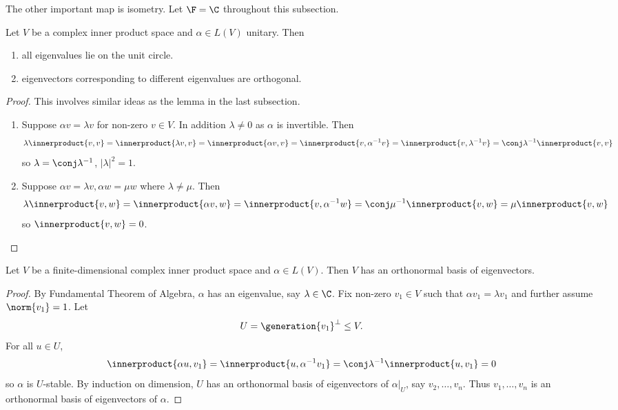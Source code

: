 \documentclass[a4paper]{article}
\newcommand*{\spans}{\generation}
\newcommand*{\ip}{\innerproduct}
\theoremstyle{definition}
\begin{document}
The other important map is isometry. Let \(\F = \C\) throughout this subsection.

\begin{lemma}
  Let \(V\) be a complex inner product space and \(\alpha \in L(V)\) unitary. Then
  \begin{enumerate}
  \item all eigenvalues lie on the unit circle.
  \item eigenvectors corresponding to different eigenvalues are orthogonal.
  \end{enumerate}
\end{lemma}

\begin{proof}
  This involves similar ideas as the lemma in the last subsection.
  \begin{enumerate}
  \item Suppose \(\alpha v = \lambda v\) for non-zero \(v \in V\). In addition \(\lambda \neq 0\) as \(\alpha\) is invertible. Then
    \[
      \lambda \ip{v, v} = \ip{\lambda v, v} = \ip{\alpha v, v} = \ip{v, \alpha^{-1} v} = \ip{v, \lambda^{-1} v} = \conj \lambda^{-1} \ip{v, v}
    \]
    so \(\lambda = \conj \lambda^{-1}\), \(|\lambda|^2 = 1\).
  \item Suppose \(\alpha v = \lambda v, \alpha w = \mu w\) where \(\lambda \neq \mu\). Then
    \[
      \lambda \ip{v, w} = \ip{\alpha v, w} = \ip{v, \alpha^{-1} w} = \conj \mu^{-1} \ip{v, w} = \mu \ip{v, w}
    \]
    so \(\ip{v, w} = 0\).
  \end{enumerate}
\end{proof}

\begin{theorem}
  Let \(V\) be a finite-dimensional complex inner product space and \(\alpha \in L(V)\). Then \(V\) has an orthonormal basis of eigenvectors.
\end{theorem}

\begin{proof}
  By Fundamental Theorem of Algebra, \(\alpha\) has an eigenvalue, say \(\lambda \in \C\). Fix non-zero \(v_1 \in V\) such that \(\alpha v_1 = \lambda v_1\) and further assume \(\norm{v_1} = 1\). Let
  \[
    U = \spans{v_1}^\perp \leq V.
  \]
  For all \(u \in U\),
  \[
    \ip{\alpha u, v_1} = \ip{u, \alpha^{-1} v_1} = \conj \lambda^{-1} \ip{u, v_1} = 0
  \]
  so \(\alpha\) is \(U\)-stable. By induction on dimension, \(U\) has an orthonormal basis of eigenvectors of \(\alpha|_U\), say \(v_2, \dots, v_n\). Thus \(v_1, \dots, v_n\) is an orthonormal basis of eigenvectors of \(\alpha\).
\end{proof}
\end{document}
